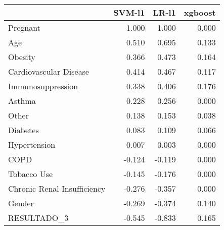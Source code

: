 \begin{tabular}{lrrr}
\toprule
{} &  SVM-l1 &  LR-l1 &  xgboost \\
\midrule
Pregnant                    &   1.000 &  1.000 &    0.000 \\
Age                         &   0.510 &  0.695 &    0.133 \\
Obesity                     &   0.366 &  0.473 &    0.164 \\
Cardiovascular Disease      &   0.414 &  0.467 &    0.117 \\
Immunosuppression           &   0.338 &  0.406 &    0.176 \\
Asthma                      &   0.228 &  0.256 &    0.000 \\
Other                       &   0.138 &  0.153 &    0.038 \\
Diabetes                    &   0.083 &  0.109 &    0.066 \\
Hypertension                &   0.007 &  0.003 &    0.000 \\
COPD                        &  -0.124 & -0.119 &    0.000 \\
Tobacco Use                 &  -0.145 & -0.176 &    0.000 \\
Chronic Renal Insufficiency &  -0.276 & -0.357 &    0.000 \\
Gender                      &  -0.269 & -0.374 &    0.140 \\
RESULTADO\_3                 &  -0.545 & -0.833 &    0.165 \\
\bottomrule
\end{tabular}
